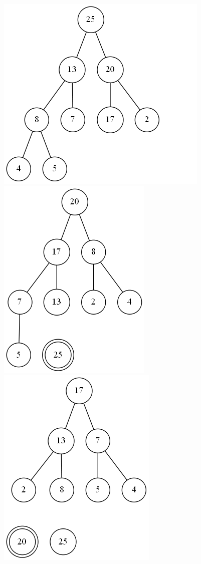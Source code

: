 \documentclass[a4paper]{article}
\begin{document}
\begin{enumerate}
        \begin{changemargin}{-1cm}{-1cm}
            \begin{center}
                \includegraphics[scale=0.3]{64-1a} \phantom{space}
                \includegraphics[scale=0.3]{64-1b} \phantom{space}
                \includegraphics[scale=0.3]{64-1c} 

\end{center}
\end{changemargin}
\end{enumerate}
\end{document}
